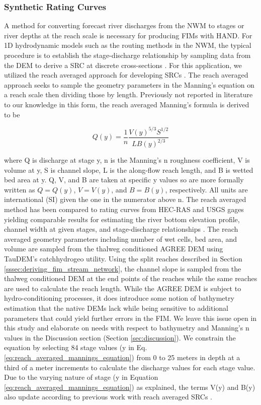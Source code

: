 \documentclass[draft]{dependencies/agujournal2019}
\begin{document}
\subsubsection{Synthetic Rating Curves}
\label{sssec:synthetic_rating_curve}
%
A method for converting forecast river discharges from the NWM to stages or river depths at the reach scale is necessary for producing FIMs with HAND. 
For 1D hydrodynamic models such as the routing methods in the NWM, the typical procedure is to establish the stage-discharge relationship by sampling data from the DEM to derive a SRC at discrete cross-sections \cite{quintero2021development,di2011hydraulic}. 
For this application, we utilized the reach averaged approach for developing SRCs \cite{zheng2018river}.
The reach averaged approach seeks to sample the geometry parameters in the Manning's equation \cite{gauckler1867etudes,manning1890flow} on a reach scale then dividing those by length. 
Previously not reported in literature to our knowledge in this form, the reach averaged Manning's formula is derived to be 
%
\begin{linenomath*}
\begin{equation}
\label{eq:reach_averaged_mannings_equation}
Q(y) = \frac{1}{n} \frac{V(y)^{5/3}S^{1/2}}{L B(y)^{2/3}} 
\end{equation}
\end{linenomath*}
%
where Q is discharge at stage y, n is the Manning's n roughness coefficient, V is volume at y, S is channel slope, L is the along-flow reach length, and B is wetted bed area at y.
Q, V, and B are taken at specific y values so are more formally written as $Q = Q(y)$, $V = V(y)$, and $B = B(y)$, respectively.
All units are international (SI) given the one in the numerator above n.
The reach averaged method has been compared to rating curves from HEC-RAS and USGS gages yielding comparable results for estimating the river bottom elevation profile, channel width at given stages, and stage-discharge relationships \cite{zheng2018river}.
The reach averaged geometry parameters including number of wet cells, bed area, and volume are sampled from the thalweg conditioned AGREE DEM using TauDEM's catchhydrogeo utility.
Using the split reaches described in Section \ref{sssec:deriving_fim_stream_network}, the channel slope is sampled from the thalweg conditioned DEM at the end points of the reaches while the same reaches are used to calculate the reach length.
While the AGREE DEM is subject to hydro-conditioning processes, it does introduce some notion of bathymetry estimation that the native DEMs lack while being sensitive to additional parameters that could yield further errors in the FIM.
We leave this issue open in this study and elaborate on needs with respect to bathymetry and Manning's n values in the Discussion section (Section \ref{sec:discussion}).
We constrain the equation by selecting 84 stage values (y in Eq. \ref{eq:reach_averaged_mannings_equation}) from 0 to 25 meters in depth at a third of a meter increments to calculate the discharge values for each stage value. 
Due to the varying nature of stage (y in Equation \ref{eq:reach_averaged_mannings_equation}) as explained, the terms V(y) and B(y) also update according to previous work with reach averaged SRCs \cite{zheng2018river}.
\end{document}
